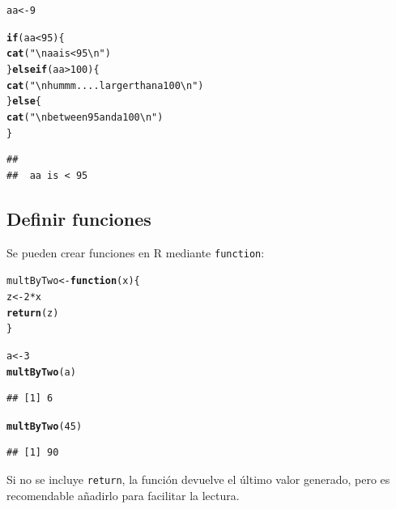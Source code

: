 \documentclass{config/apuntes}\usepackage[]{graphicx}\usepackage[]{xcolor}
\makeatletter
\newcommand{\hlnum}[1]{\textcolor[rgb]{0.686,0.059,0.569}{#1}}%
\newcommand{\hlsng}[1]{\textcolor[rgb]{0.192,0.494,0.8}{#1}}%
\newcommand{\hlopt}[1]{\textcolor[rgb]{0,0,0}{#1}}%
\newcommand{\hldef}[1]{\textcolor[rgb]{0.345,0.345,0.345}{#1}}%
\newcommand{\hlkwa}[1]{\textcolor[rgb]{0.161,0.373,0.58}{\textbf{#1}}}%
\newcommand{\hlkwb}[1]{\textcolor[rgb]{0.69,0.353,0.396}{#1}}%
\newcommand{\hlkwc}[1]{\textcolor[rgb]{0.333,0.667,0.333}{#1}}%
\newcommand{\hlkwd}[1]{\textcolor[rgb]{0.737,0.353,0.396}{\textbf{#1}}}%
\newenvironment{kframe}{%
 \def\at@end@of@kframe{}%
 \ifinner\ifhmode%
  \def\at@end@of@kframe{\end{minipage}}%
  \begin{minipage}{\columnwidth}%
 \fi\fi%
 \def\FrameCommand##1{\hskip\@totalleftmargin \hskip-\fboxsep
 \colorbox{shadecolor}{##1}\hskip-\fboxsep
     \hskip-\linewidth \hskip-\@totalleftmargin \hskip\columnwidth}%
 \MakeFramed {\advance\hsize-\width
   \@totalleftmargin\z@ \linewidth\hsize
   \@setminipage}}%
 {\par\unskip\endMakeFramed%
 \at@end@of@kframe}
\newenvironment{knitrout}{}{} %
\newcommand{\code}[1]{\texttt{#1}}
\makeatother
\begin{document}
\begin{knitrout}
\color{fgcolor}\begin{kframe}
\begin{alltt}
\hldef{aa} \hlkwb{<-} \hlnum{9}

\hlkwa{if} \hldef{(aa} \hlopt{<} \hlnum{95}\hldef{) \{}
  \hlkwd{cat}\hldef{(}\hlsng{"\textbackslash{}n aa is < 95\textbackslash{}n"}\hldef{)}
\hldef{\}} \hlkwa{else if} \hldef{(aa} \hlopt{>} \hlnum{100}\hldef{) \{}
  \hlkwd{cat}\hldef{(}\hlsng{"\textbackslash{}n hummm.... larger than a 100\textbackslash{}n"}\hldef{)}
\hldef{\}} \hlkwa{else} \hldef{\{}
  \hlkwd{cat}\hldef{(}\hlsng{"\textbackslash{}n between 95 and a 100\textbackslash{}n"}\hldef{)}
\hldef{\}}
\end{alltt}
\begin{verbatim}
## 
##  aa is < 95
\end{verbatim}
\end{kframe}
\end{knitrout}

\subsection{Definir funciones}
Se pueden crear funciones en R mediante \code{function}:

\begin{knitrout}
\color{fgcolor}\begin{kframe}
\begin{alltt}
\hldef{multByTwo} \hlkwb{<-} \hlkwa{function}\hldef{(}\hlkwc{x}\hldef{) \{}
  \hldef{z} \hlkwb{<-} \hlnum{2} \hlopt{*} \hldef{x}
  \hlkwd{return}\hldef{(z)}
\hldef{\}}

\hldef{a} \hlkwb{<-} \hlnum{3}
\hlkwd{multByTwo}\hldef{(a)}
\end{alltt}
\begin{verbatim}
## [1] 6
\end{verbatim}
\begin{alltt}
\hlkwd{multByTwo}\hldef{(}\hlnum{45}\hldef{)}
\end{alltt}
\begin{verbatim}
## [1] 90
\end{verbatim}
\end{kframe}
\end{knitrout}

Si no se incluye \code{return}, la función devuelve el último valor generado, pero es recomendable añadirlo para facilitar la lectura. 
\end{document}
